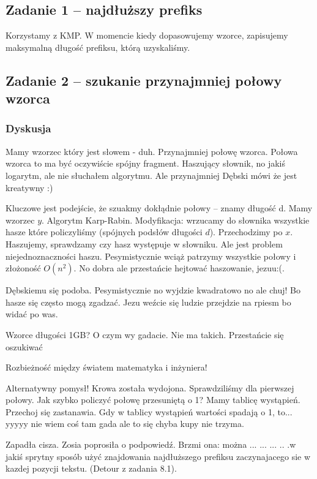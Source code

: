 \subsection{Zadanie 1 -- najdłuższy prefiks}
Korzystamy z KMP. W momencie kiedy dopasowujemy wzorce, zapisujemy maksymalną długość prefiksu, którą uzyskaliśmy.


\subsection{Zadanie 2 -- szukanie przynajmniej połowy wzorca}
\subsubsection{Dyskusja}

Mamy wzorzec który jest słowem - duh. Przynajmniej połowę wzorca. Połowa wzorca to ma być oczywiście spójny fragment.
Haszujący słownik, no jakiś logarytm, ale nie słuchałem algorytmu. Ale przynajmniej Dębski mówi że jest kreatywny :)

Kluczowe jest podejście, że szuakmy dokłądnie połowy -- znamy długość d. Mamy wzorzec $y$. Algorytm Karp-Rabin. Modyfikacja: wrzucamy do słownika wszystkie hasze które policzyliśmy (spójnych podsłów długości $d$). Przechodzimy po $x$. Haszujemy, sprawdzamy czy hasz występuje w słowniku. Ale jest problem niejednoznaczności haszu. Pesymistycznie wciąż patrzymy wszystkie połowy i złożoność $O(n^2)$. No dobra ale przestańcie hejtować haszowanie, jezuu:(. 

Dębskiemu się podoba. Pesymistycznie no wyjdzie kwadratowo no ale chuj! Bo hasze się często mogą zgadzać. Jezu weźcie się ludzie przejdzie na rpiesm bo widać po was.

Wzorce długości 1GB? O czym wy gadacie. Nie ma takich. Przestańcie się oszukiwać

Rozbieżność między światem matematyka i inżyniera!

Alternatywny pomysł! Krowa została wydojona. Sprawdziliśmy dla pierwszej połowy. Jak szybko policzyć połowę przesuniętą o 1? Mamy tablicę wystąpień. Przechoj się zastanawia. Gdy w tablicy wystąpień wartości spadają o 1, to...
yyyyy nie wiem coś tam gada ale to się chyba kupy nie trzyma.

Zapadła cisza. Zosia poprosiła o podpowiedź. Brzmi ona: można ... ... ... .. .w jakiś sprytny sposób użyć znajdowania najdłuższego prefiksu zaczynajacego sie w kazdej pozycji tekstu. (Detour z zadania 8.1). 


